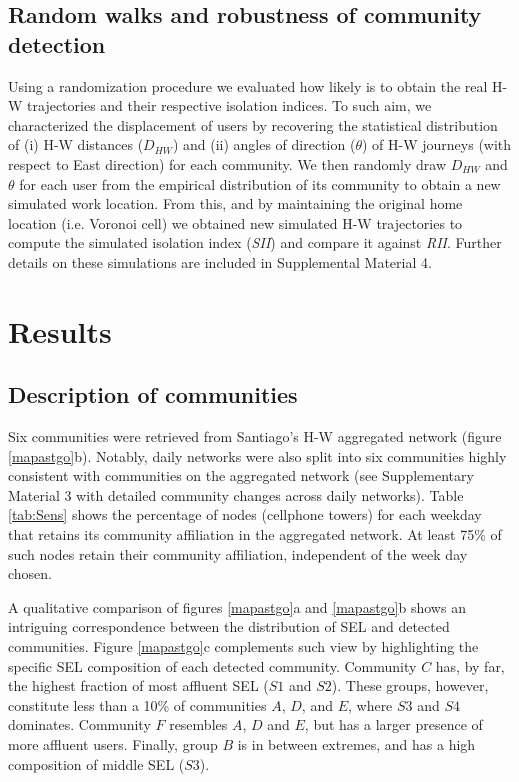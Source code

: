 \documentclass[%
preprint,
 amsmath,amssymb,
pra,
]{revtex4-1}
\begin{document}
\subsection{Random walks and robustness of community detection}
Using a randomization procedure we evaluated how likely is to obtain the real H-W trajectories and their respective isolation indices. To such aim, we characterized the displacement of users by recovering the statistical distribution of (i) H-W distances ($D_{HW}$) and (ii) angles of direction ($\theta$) of H-W journeys  (with respect to East direction) for each community. We then  randomly draw $D_{HW}$ and $\theta$  for each user from the empirical distribution of its community to obtain a new simulated work location. From this, and by maintaining the original home location  (i.e. Voronoi cell) we obtained new simulated H-W trajectories to compute the simulated isolation index (\textit{SII}) and compare it against \textit{RII}. Further details on these simulations are included in Supplemental Material 4. 


\section{Results}
\subsection{Description of communities}
Six communities were retrieved from Santiago's H-W aggregated network (figure \ref{mapastgo}b). Notably, daily networks were also split into six communities highly consistent with communities on the aggregated network (see Supplementary Material 3 with detailed community changes across daily networks). Table \ref{tab:Sens} shows the percentage of nodes (cellphone towers) for each weekday  that retains its community affiliation in the aggregated network. At least 75\% of such nodes retain their  community affiliation, independent of the week day chosen.

A qualitative comparison of figures \ref{mapastgo}a and \ref{mapastgo}b shows an intriguing correspondence between the distribution of SEL  and detected communities. Figure \ref{mapastgo}c complements such view by highlighting the specific SEL composition of each detected community. Community $C$ has, by far, the highest fraction of most affluent SEL ($S1$ and $S2$). These groups, however, constitute less than a 10\% of communities $A$, $D$, and $E$, where $S3$ and $S4$ dominates.  Community $F$ resembles  $A$, $D$ and $E$, but has a larger presence of more affluent users. Finally, group $B$ is in between extremes, and  has a high composition of middle SEL ($S3$).
\end{document}
